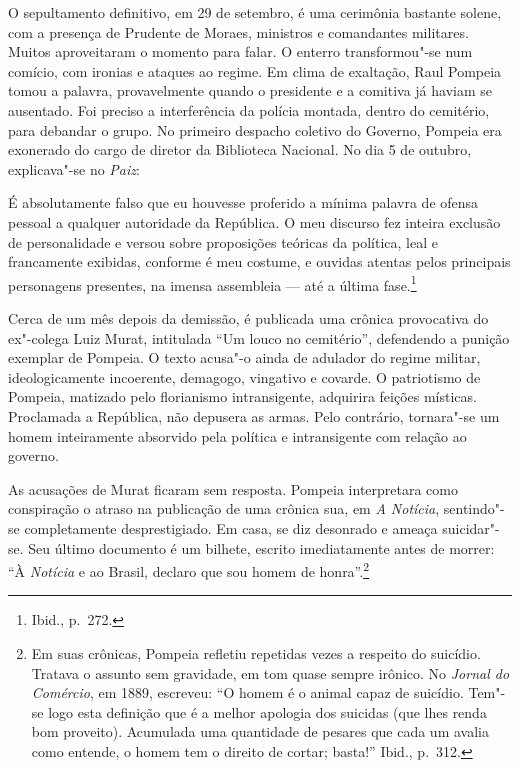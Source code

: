 O sepultamento definitivo, em 29 de setembro, é uma
cerimônia bastante solene, com a presença de Prudente de Moraes,
ministros e comandantes militares. Muitos aproveitaram o momento para
falar. O enterro transformou"-se num comício, com ironias e ataques ao
regime. Em clima de exaltação, Raul Pompeia tomou a palavra,
provavelmente quando o presidente e a comitiva já haviam se ausentado.
Foi preciso a interferência da polícia montada, dentro do cemitério,
para debandar o grupo. No primeiro despacho coletivo do Governo,
Pompeia era exonerado do cargo de diretor da Biblioteca Nacional. No
dia 5 de outubro, explicava"-se no \textit{Paiz}:

\begin{hedraquote}
É absolutamente falso que eu houvesse proferido a mínima
palavra de ofensa pessoal a qualquer autoridade da República. O meu
discurso fez inteira exclusão de personalidade e versou sobre
proposições teóricas da política, leal e francamente exibidas, conforme
é meu costume, e ouvidas atentas pelos principais personagens
presentes, na imensa assembleia --- até a última fase.\footnote{Ibid., p.~272.} 
\end{hedraquote}


Cerca de um mês depois da demissão, é publicada uma crônica provocativa
do ex"-colega Luiz Murat, intitulada ``Um louco no cemitério'',
defendendo a punição exemplar de Pompeia. O texto acusa"-o ainda de
adulador do regime militar, ideologicamente incoerente, demagogo,
vingativo e covarde. O patriotismo de Pompeia, matizado pelo
florianismo intransigente, adquirira feições místicas. Proclamada a
República, não depusera as armas. Pelo contrário, tornara"-se um homem
inteiramente absorvido pela política e intransigente com relação ao
governo.

As acusações de Murat ficaram sem resposta. Pompeia
interpretara como conspiração o atraso na publicação de uma crônica
sua, em \textit{A Notícia}, sentindo"-se
completamente desprestigiado. Em casa, se diz desonrado e ameaça
suicidar"-se. Seu último documento é um bilhete, escrito imediatamente
antes de morrer: ``À \textit{Notícia} e ao
Brasil, declaro que sou homem de honra''.\footnote{Em suas crônicas, 
Pompeia refletiu repetidas vezes a respeito do suicídio.
Tratava o assunto sem gravidade, em tom quase sempre irônico. No
\textit{Jornal do Comércio}, em 1889,
escreveu: ``O homem é o animal capaz de suicídio. Tem"-se logo esta
definição que é a melhor apologia dos suicidas (que lhes renda bom
proveito). Acumulada uma quantidade de pesares que cada um avalia como
entende, o homem tem o direito de cortar; basta!'' Ibid., p.~312.}


